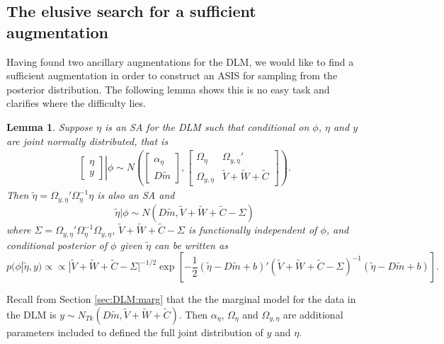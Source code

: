 \documentclass[12pt]{article}
\newtheorem{lem}[thm]{Lemma}
\begin{document}
\subsection{The elusive search for a sufficient augmentation}

Having found two ancillary augmentations for the DLM, we would like to find a sufficient augmentation in order to construct an ASIS for sampling from the posterior distribution. The following lemma shows this is no easy task and clarifies where the difficulty lies.

\begin{lem}\label{noSA}
Suppose $\eta$ is an SA for the DLM such that conditional on $\phi$, $\eta$ and $y$ are joint normally distributed, that is
\begin{align*}
 \left. \begin{bmatrix}\eta \\ y \end{bmatrix}\right|\phi \sim N\left(\begin{bmatrix} \alpha_\eta \\ D\tilde{m} \end{bmatrix}, \begin{bmatrix}
   \Omega_\eta & \Omega_{y,\eta}' \\
   \Omega_{y,\eta} & \tilde{V} + \tilde{W} + \tilde{C} \end{bmatrix}\right).
\end{align*}
Then $\tilde{\eta}=\Omega_{y,\eta}'\Omega_{\eta}^{-1}\eta$ is also an SA and
\[
\tilde{\eta}|\phi \sim N(D\tilde{m},\tilde{V} + \tilde{W} + \tilde{C} - \Sigma)
\]
where $\Sigma=\Omega_{y,\eta}'\Omega_{\eta}^{-1}\Omega_{y,\eta}$, $\tilde{V} + \tilde{W} + \tilde{C} - \Sigma$ is functionally independent of $\phi$, and conditional posterior of $\phi$ given $\tilde{\eta}$ can be written as
\[
p(\phi|\tilde{\eta},y) \propto \propto |\tilde{V} + \tilde{W} + \tilde{C} - \Sigma|^{-1/2}\exp\left[-\frac{1}{2}(\tilde{\eta} - D\tilde{m} + b)'(\tilde{V} + \tilde{W} + \tilde{C} - \Sigma)^{-1}(\tilde{\eta} - D\tilde{m} + b)\right].
\]
\end{lem}
Recall from Section \ref{sec:DLM:marg} that the the marginal model for the data in the DLM is $y\sim N_{Tk}(D\tilde{m}, \tilde{V} + \tilde{W} + \tilde{C})$. Then $\alpha_\eta$, $\Omega_\eta$ and $\Omega_{y,\eta}$ are additional parameters included to defined the full joint distribution of $y$ and $\eta$.
\end{document}
